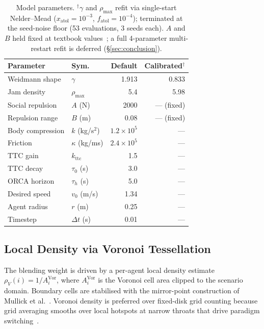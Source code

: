 \documentclass[a4paper,twoside]{article}
\begin{document}
\begin{table}[h]
\caption{Model parameters. $^{\dagger}$$\gamma$ and $\rho_{\max}$ refit via single-start Nelder--Mead ($x_{\text{atol}}{=}10^{-3}$, $f_{\text{atol}}{=}10^{-4}$); terminated at the seed-noise floor (53 evaluations, 3 seeds each). $A$ and $B$ held fixed at textbook values~\cite{Helbing00}; a full 4-parameter multi-restart refit is deferred (\S\ref{sec:conclusion}).}\label{tab:params}
\centering\footnotesize
\begin{tabular}{@{}llrr@{}}
\toprule
\textbf{Parameter} & \textbf{Sym.} & \textbf{Default} & \textbf{Calibrated$^{\dagger}$} \\
\midrule
Weidmann shape & $\gamma$ & 1.913 & 0.833 \\
Jam density & $\rho_{\max}$ & 5.4 & 5.98 \\
Social repulsion & $A$ (N) & 2000 & --- (fixed) \\
Repulsion range & $B$ (m) & 0.08 & --- (fixed) \\
Body compression & $k$ (kg/s$^2$) & $1.2{\times}10^5$ & --- \\
Friction & $\kappa$ (kg/ms) & $2.4{\times}10^5$ & --- \\
TTC gain & $k_{\text{ttc}}$ & 1.5 & --- \\
TTC decay & $\tau_0$ (s) & 3.0 & --- \\
ORCA horizon & $\tau_h$ (s) & 5.0 & --- \\
Desired speed & $v_0$ (m/s) & 1.34 & --- \\
Agent radius & $r$ (m) & 0.25 & --- \\
Timestep & $\Delta t$ (s) & 0.01 & --- \\
\bottomrule
\end{tabular}
\end{table}

\subsection{Local Density via Voronoi Tessellation}
\label{sec:density}

The blending weight is driven by a per-agent local density estimate $\rho_V(i) = 1/A_i^{\text{Vor}}$, where $A_i^{\text{Vor}}$ is the Voronoi cell area clipped to the scenario domain. Boundary cells are stabilised with the mirror-point construction of Mullick et al.~\cite{Mullick24}. Voronoi density is preferred over fixed-disk grid counting because grid averaging smooths over local hotspots at narrow throats that drive paradigm switching~\cite{Steffen10}.
\end{document}
